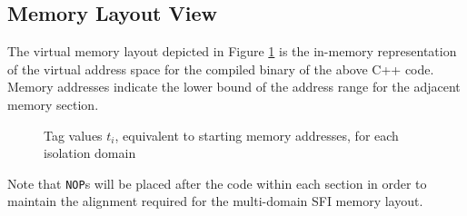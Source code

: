\documentclass[12pt]{article}
\begin{document}
\subsection{Memory Layout View}

The virtual memory layout depicted in Figure \ref{domains_mem} is the in-memory representation of the virtual address space for the compiled binary of the above C++ code. Memory addresses indicate the lower bound of the address range for the adjacent memory section.\\

\begin{figure}[p]
\begin{drawstack}[scale=0.75]
	\footnotesize
	\startframe
		 
	\startframe
		 
	\startframe
		 
	\startframe
		 
	\startframe
		 
\end{drawstack}
\caption{Tag values $t_i$, equivalent to starting memory addresses, for each isolation domain} \label{domains_mem}
\end{figure}

Note that \texttt{NOP}s will be placed after the code within each section in order to maintain the alignment required for the multi-domain SFI memory layout.
\end{document}
